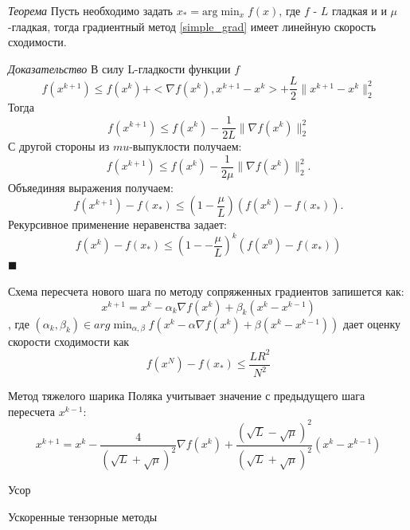 \textit{Теорема} Пусть необходимо задать $x_*=\text{arg} \min_x f(x)$, где $f$ - $L$ гладкая и
и $\mu$ -гладкая, тогда градиентный метод \ref{simple_grad} имеет линейную скорость сходимости.

\textit{Доказательство} В силу L-гладкости функции $f$
\begin{equation}
    f(x^{k+1}) \le f(x^k) + <\nabla f(x^k), x^{k+1} -x^k> +\frac{L}{2} \|x^{k+1}-x^k\|_2^2
\end{equation}
Тогда 
\begin{equation}
    f(x^{k+1}) \le f(x^k) - \frac{1}{2L} \| \nabla f(x^k) \|^2_2
\end{equation}
С другой стороны из $mu$-выпуклости получаем:
\begin{equation}
    f(x^{k+1}) \le f(x^k) - \frac{1}{2\mu} \| \nabla f(x^k) \|^2_2.
\end{equation}
Объяединяя выражения получаем:
\begin{equation}
    f(x^{k+1}) -f(x_*) \le \left(1-\frac{\mu}{L}\right) (f(x^k)-f(x_*)).
\end{equation}
Рекурсивное применение неравенства задает:
\begin{equation}
    f(x^k) - f(x_*) \le (1--\frac{\mu}{L})^k (f(x^0)-f(x_*))
\end{equation}
$\blacksquare$

Схема пересчета нового шага по методу сопряженных градиентов запишется как:
\begin{equation}
    x^{k+1} = x^k - \alpha_k \nabla f(x^k) + \beta_k (x^k -x^{k-1})
\end{equation}
, где $(\alpha_k,\beta_k) \in arg \min_{\alpha,\beta} f(x^k - \alpha \nabla f(x^k) + \beta (x^k -x^{k-1}))$
дает оценку скорости сходимости как 
\begin{equation}
    f(x^N) -f(x_*) \le \frac{L R^2}{N^2}
\end{equation}


Метод тяжелого шарика Поляка учитывает значение
с предыдущего шага пересчета $x^{k-1}$:
\begin{equation}
    x^{k+1} = x^k - \frac{4}{(\sqrt{L}+ \sqrt{\mu})^2} \nabla f(x^k) + \frac{(\sqrt{L} -\sqrt{\mu})^2}{(\sqrt{L} +\sqrt{\mu})^2} (x^k - x^{k-1})
\end{equation}

Усор


Ускоренные тензорные методы



    

